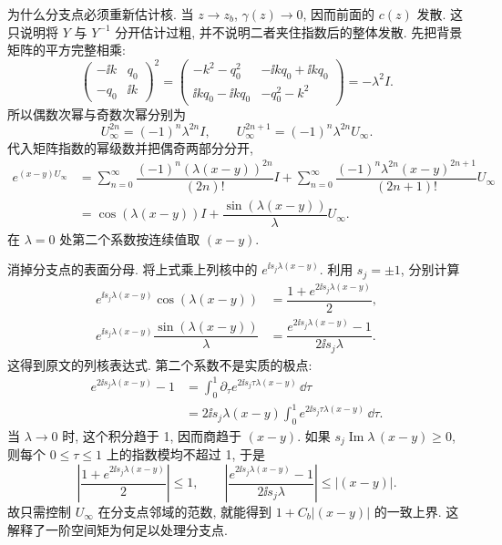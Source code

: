 \par\medskip\noindent 为什么分支点必须重新估计核.\quad
当 $z\to z_b$, $\gamma(z)\to0$, 因而前面的
$c(z)$ 发散. 这只说明将 $Y$ 与 $Y^{-1}$ 分开估计过粗,
并不说明二者夹住指数后的整体发散.
先把背景矩阵的平方完整相乘:
\begin{equation*}
\begin{pmatrix}-\ii k&q_0\\-q_0&\ii k\end{pmatrix}^2
=\begin{pmatrix}
-k^2-q_0^2&-\ii kq_0+\ii kq_0\\
\ii kq_0-\ii kq_0&-q_0^2-k^2
\end{pmatrix}
=-\lambda^2I.
\end{equation*}
所以偶数次幂与奇数次幂分别为
\begin{equation*}
U_\infty^{2n}=(-1)^n\lambda^{2n}I,
\qquad
U_\infty^{2n+1}=(-1)^n\lambda^{2n}U_\infty.
\end{equation*}
代入矩阵指数的幂级数并把偶奇两部分分开,
\begin{align*}
e^{(x-y)U_\infty}
&=\sum\limits_{n=0}^{\infty}\dfrac{(-1)^n(\lambda (x-y))^{2n}}{(2n)!}I
+\sum\limits_{n=0}^{\infty}\dfrac{(-1)^n\lambda^{2n}(x-y)^{2n+1}}{(2n+1)!}U_\infty\\
&=\cos(\lambda (x-y))I+\dfrac{\sin(\lambda (x-y))}{\lambda}U_\infty.
\end{align*}
在 $\lambda=0$ 处第二个系数按连续值取 $(x-y)$.



\par\medskip\noindent 消掉分支点的表面分母.\quad
将上式乘上列核中的 $e^{\ii s_j\lambda (x-y)}$.
利用 $s_j=\pm1$, 分别计算
\begin{align*}
e^{\ii s_j\lambda (x-y)}\cos(\lambda (x-y))
&=\dfrac{1+e^{2\ii s_j\lambda (x-y)}}{2},\\
e^{\ii s_j\lambda (x-y)}\dfrac{\sin(\lambda (x-y))}{\lambda}
&=\dfrac{e^{2\ii s_j\lambda (x-y)}-1}{2\ii s_j\lambda}.
\end{align*}
这得到原文的列核表达式. 第二个系数不是实质的极点:
\begin{align*}
e^{2\ii s_j\lambda (x-y)}-1
&=\int_0^1\partial_\tau
 e^{2\ii s_j\tau\lambda (x-y)}\,\dd\tau\\
&=2\ii s_j\lambda (x-y)\int_0^1
 e^{2\ii s_j\tau\lambda (x-y)}\,\dd\tau.
\end{align*}
当 $\lambda\to0$ 时, 这个积分趋于 1, 因而商趋于 $(x-y)$.
如果 $s_j\operatorname{Im}\lambda\,(x-y)\ge0$, 则每个
$0\le\tau\le1$ 上的指数模均不超过 1, 于是
\begin{equation*}
\left|\dfrac{1+e^{2\ii s_j\lambda (x-y)}}{2}\right|\le1,
\qquad
\left|\dfrac{e^{2\ii s_j\lambda (x-y)}-1}{2\ii s_j\lambda}\right|
\le|(x-y)|.
\end{equation*}
故只需控制 $U_\infty$ 在分支点邻域的范数,
就能得到 $1+C_b|(x-y)|$ 的一致上界.
这解释了一阶空间矩为何足以处理分支点.



